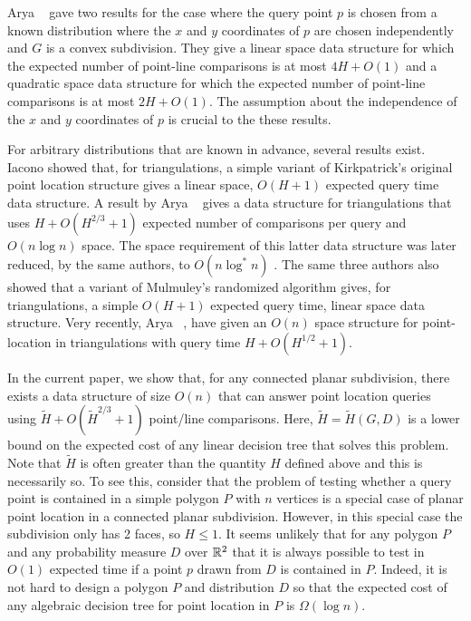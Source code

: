 \documentclass[lotsofwhite]{patmorin}
\begin{document}
Arya \etal\ \cite{acmr00} gave two results for the case where the
query point $p$ is chosen from a known distribution where the $x$ and
$y$ coordinates of $p$ are chosen independently and $G$ is a convex
subdivision.  They give a linear space data structure for which the
expected number of point-line comparisons is at most $4H+O(1)$ and a
quadratic space data structure for which the expected number of
point-line comparisons is at most $2H+O(1)$.  The assumption about the
independence of the $x$ and $y$ coordinates of $p$ is crucial to the
these results.

For arbitrary distributions that are known in advance, several results
exist.  Iacono \cite{i01,i04} showed that, for triangulations, a
simple variant of Kirkpatrick's original point location structure
gives a linear space, $O(H+1)$ expected query time data structure.  A
result by Arya \etal\ \cite{amm00} gives a data structure for
triangulations that uses $H + O(H^{2/3}+1)$ expected number of
comparisons per query and $O(n\log n)$ space.  The space requirement
of this latter data structure was later reduced, by the same authors,
to $O(n\log^* n)$ \cite{amm01a}.  The same three authors
\cite{amm01b} also showed that a variant of Mulmuley's randomized algorithm
gives, for triangulations, a simple $O(H+1)$ expected query time,
linear space data structure.  Very recently, Arya \etal\
\cite{ammw07}, have given an $O(n)$ space structure for point-location
in triangulations with query time $H+O(H^{1/2}+1)$. 

In the current paper, we show that, for any connected planar
subdivision, there exists a data structure of size $O(n)$ that can
answer point location queries using $\tilde H + O(\tilde H^{2/3}+1)$
point/line comparisons.  Here, $\tilde H=\tilde H(G,D)$ is a lower
bound on the expected cost of any linear decision tree that solves
this problem.  Note that $\tilde H$ is often greater than the quantity
$H$ defined above and this is necessarily so.  To see this, consider
that the problem of testing whether a query point is contained in a
simple polygon $P$ with $n$ vertices is a special case of planar point
location in a connected planar subdivision.  However, in this special
case the subdivision only has 2 faces, so $H\le 1$.  It seems unlikely
that for any polygon $P$ and any probability measure $D$ over $\mathbb{R}^2$
that it is always possible to test in $O(1)$ expected time if a point
$p$ drawn from $D$ is contained in $P$.  Indeed, it is not hard to
design a polygon $P$ and distribution $D$ so that the expected cost of
any algebraic decision tree for point location in $P$ is $\Omega(\log
n)$.
\end{document}
